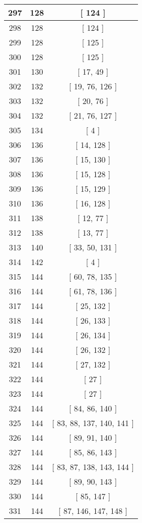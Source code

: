 \begin{center}
\begin{longtable}[H]{|| c c c ||}
\\\hline
297 & 128 & [ 124 ]
\\\hline
298 & 128 & [ 124 ]
\\\hline
299 & 128 & [ 125 ]
\\\hline
300 & 128 & [ 125 ]
\\\hline
301 & 130 & [ 17, 49 ]
\\\hline
302 & 132 & [ 19, 76, 126 ]
\\\hline
303 & 132 & [ 20, 76 ]
\\\hline
304 & 132 & [ 21, 76, 127 ]
\\\hline
305 & 134 & [ 4 ]
\\\hline
306 & 136 & [ 14, 128 ]
\\\hline
307 & 136 & [ 15, 130 ]
\\\hline
308 & 136 & [ 15, 128 ]
\\\hline
309 & 136 & [ 15, 129 ]
\\\hline
310 & 136 & [ 16, 128 ]
\\\hline
311 & 138 & [ 12, 77 ]
\\\hline
312 & 138 & [ 13, 77 ]
\\\hline
313 & 140 & [ 33, 50, 131 ]
\\\hline
314 & 142 & [ 4 ]
\\\hline
315 & 144 & [ 60, 78, 135 ]
\\\hline
316 & 144 & [ 61, 78, 136 ]
\\\hline
317 & 144 & [ 25, 132 ]
\\\hline
318 & 144 & [ 26, 133 ]
\\\hline
319 & 144 & [ 26, 134 ]
\\\hline
320 & 144 & [ 26, 132 ]
\\\hline
321 & 144 & [ 27, 132 ]
\\\hline
322 & 144 & [ 27 ]
\\\hline
323 & 144 & [ 27 ]
\\\hline
324 & 144 & [ 84, 86, 140 ]
\\\hline
325 & 144 & [ 83, 88, 137, 140, 141 ]
\\\hline
326 & 144 & [ 89, 91, 140 ]
\\\hline
327 & 144 & [ 85, 86, 143 ]
\\\hline
328 & 144 & [ 83, 87, 138, 143, 144 ]
\\\hline
329 & 144 & [ 89, 90, 143 ]
\\\hline
330 & 144 & [ 85, 147 ]
\\\hline
331 & 144 & [ 87, 146, 147, 148 ]
\\\hline

\end{longtable}
\end{center}
